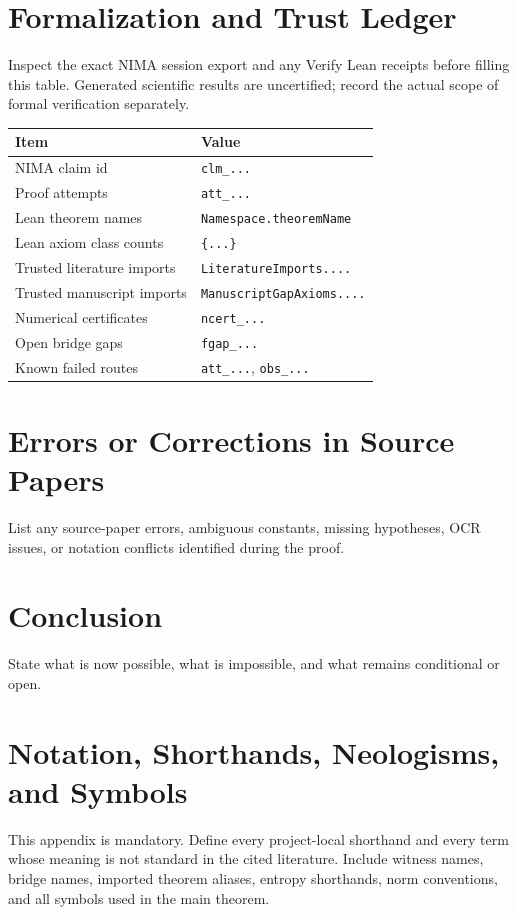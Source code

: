 \documentclass[11pt]{article}
\begin{document}
\section{Formalization and Trust Ledger}
\label{sec:trust-ledger}

Inspect the exact NIMA session export and any Verify Lean receipts before filling this table.
Generated scientific results are uncertified; record the actual scope of formal verification separately.

\begin{center}
\begin{tabular}{ll}
\toprule
Item & Value \\
\midrule
NIMA claim id & \texttt{clm\_...} \\
Proof attempts & \texttt{att\_...} \\
Lean theorem names & \texttt{Namespace.theoremName} \\
Lean axiom class counts & \texttt{\{...\}} \\
Trusted literature imports & \texttt{LiteratureImports....} \\
Trusted manuscript imports & \texttt{ManuscriptGapAxioms....} \\
Numerical certificates & \texttt{ncert\_...} \\
Open bridge gaps & \texttt{fgap\_...} \\
Known failed routes & \texttt{att\_...}, \texttt{obs\_...} \\
\bottomrule
\end{tabular}
\end{center}

\section{Errors or Corrections in Source Papers}
List any source-paper errors, ambiguous constants, missing hypotheses, OCR
issues, or notation conflicts identified during the proof.

\section{Conclusion}
State what is now possible, what is impossible, and what remains conditional or
open.

\appendix

\section{Notation, Shorthands, Neologisms, and Symbols}
This appendix is mandatory. Define every project-local shorthand and every term
whose meaning is not standard in the cited literature. Include witness names,
bridge names, imported theorem aliases, entropy shorthands, norm conventions,
and all symbols used in the main theorem.
\end{document}

